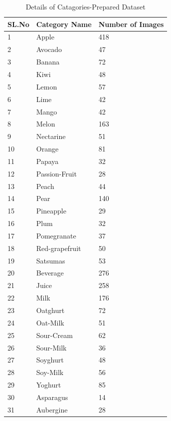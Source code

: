 \begin{table}[h]
\centering
\caption{Details of Catagories-Prepared Dataset}
\captionsetup[table]{skip=10pt}
\label{table:p-table}

 \def\arraystretch{0.95}
{
\begin{tabular}{lll}
\hline
SL.No                                      & Category Name                                 & Number of Images \\ \hline
1        & Apple  & 418 \\
2        & Avocado  & 47 \\
3        & Banana  & 72 \\
4        & Kiwi  & 48 \\
5        & Lemon  & 57 \\
6        & Lime  & 42 \\
7        & Mango  & 42 \\
8        & Melon  & 163 \\
9        & Nectarine  & 51 \\
10        & Orange  & 81 \\
11        & Papaya  & 32 \\
12        & Passion-Fruit  & 28 \\
13        & Peach  & 44 \\
14        & Pear  & 140 \\
15        & Pineapple  & 29 \\
16        & Plum  & 32 \\
17        & Pomegranate  & 37 \\
18        & Red-grapefruit  & 50 \\
19        & Satsumas  & 53 \\
20        & Beverage  & 276 \\
21        & Juice  & 258 \\
22        & Milk  & 176 \\
23        & Oatghurt  & 72 \\
24        & Oat-Milk  & 51 \\
25       & Sour-Cream  & 62 \\
26        & Sour-Milk  & 36 \\
27       & Soyghurt  & 48 \\
28        & Soy-Milk  & 56 \\
29       & Yoghurt  & 85 \\
30       & Asparagus  & 14 \\
31       & Aubergine  & 28 \\

\end{tabular}}
\end{table}
